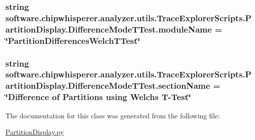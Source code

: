 \subsubsection[{module\+Name}]{\setlength{\rightskip}{0pt plus 5cm}string software.\+chipwhisperer.\+analyzer.\+utils.\+Trace\+Explorer\+Scripts.\+Partition\+Display.\+Difference\+Mode\+T\+Test.\+module\+Name = \char`\"{}Partition\+Differences\+Welch\+T\+Test\char`\"{}\hspace{0.3cm}{\ttfamily [static]}}\label{classsoftware_1_1chipwhisperer_1_1analyzer_1_1utils_1_1TraceExplorerScripts_1_1PartitionDisplay_1_1DifferenceModeTTest_a22c55a5fc394bf227f49064147a10e3b}
\hypertarget{classsoftware_1_1chipwhisperer_1_1analyzer_1_1utils_1_1TraceExplorerScripts_1_1PartitionDisplay_1_1DifferenceModeTTest_a0fb8b4f27568aebdfc67d85d1176c406}{}
\subsubsection[{section\+Name}]{\setlength{\rightskip}{0pt plus 5cm}string software.\+chipwhisperer.\+analyzer.\+utils.\+Trace\+Explorer\+Scripts.\+Partition\+Display.\+Difference\+Mode\+T\+Test.\+section\+Name = \char`\"{}Difference of Partitions using Welch\textquotesingle{}s T-\/Test\char`\"{}\hspace{0.3cm}{\ttfamily [static]}}\label{classsoftware_1_1chipwhisperer_1_1analyzer_1_1utils_1_1TraceExplorerScripts_1_1PartitionDisplay_1_1DifferenceModeTTest_a0fb8b4f27568aebdfc67d85d1176c406}


The documentation for this class was generated from the following file\+:\begin{DoxyCompactItemize}
\item 
\hyperlink{PartitionDisplay_8py}{Partition\+Display.\+py}\end{DoxyCompactItemize}
